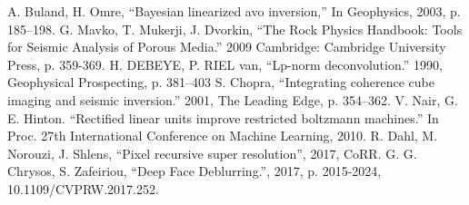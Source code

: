 \documentclass[conference,compsoc]{IEEEtran}
\begin{document}
\begin{thebibliography}{1}
		A. Buland,  H. Omre, ``Bayesian linearized avo inversion,'' In Geophysics, 2003, p. 185–198.
		G. Mavko, T. Mukerji, J. Dvorkin, ``The Rock Physics Handbook: Tools for Seismic Analysis of Porous Media.'' 2009 Cambridge: Cambridge University Press, p. 359-369.
		H. DEBEYE, P. RIEL van, ``Lp-norm deconvolution.'' 1990, Geophysical Prospecting, p. 381–403
		S. Chopra, ``Integrating coherence cube imaging and seismic inversion.'' 2001, The Leading Edge, p. 354–362.
 		V. Nair, G. E. Hinton. ``Rectified linear units improve restricted boltzmann machines.'' In Proc. 27th International Conference on Machine Learning, 2010.
		R. Dahl, M. Norouzi, J. Shlens, ``Pixel recursive super resolution'', 2017, CoRR.
		G. G. Chrysos, S. Zafeiriou, ``Deep Face Deblurring.'', 2017, p. 2015-2024, 10.1109/CVPRW.2017.252. 
\end{thebibliography}



\end{document}
